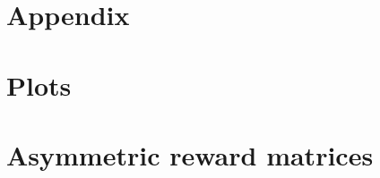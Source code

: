 \documentclass[twoside,11pt]{article}
\begin{document}
\renewcommand{\appendixpagename}{}
\begin{appendices}
  \section*{Appendix}

  \section{Plots}

  \newpage

  \section{Asymmetric reward matrices}
  \label{sec:asym_rew_mat}

  \setcounter{MaxMatrixCols}{11}


\end{appendices}
\end{document}
